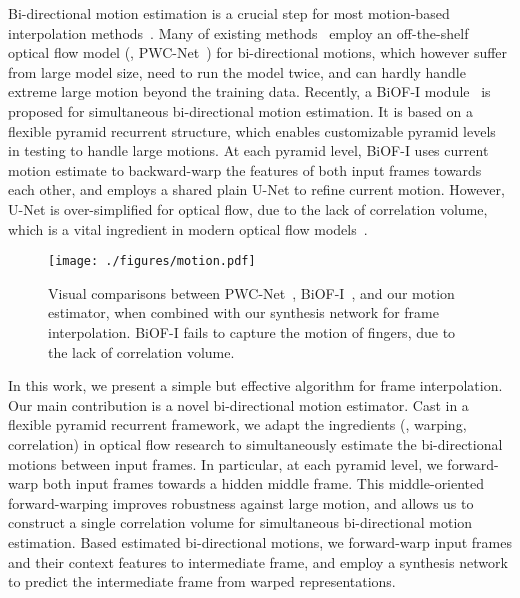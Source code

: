 \documentclass[10pt,twocolumn,letterpaper]{article}
\begin{document}
Bi-directional motion estimation is a crucial step for most motion-based
interpolation
methods~\cite{niklaus2018context,niklaus2020softmax,jiang2018super,bao2019depth,sim2021xvfi}.
Many of existing
methods~\cite{niklaus2018context,bao2019depth,niklaus2020softmax} employ an
off-the-shelf optical flow model (\eg, PWC-Net~\cite{sun2018pwc}) for
bi-directional motions, which however suffer from large model size, need to run
the model twice, and can hardly handle extreme large motion beyond the training
data. Recently, a BiOF-I module~\cite{sim2021xvfi} is proposed for simultaneous
bi-directional motion estimation. It is based on a flexible pyramid recurrent
structure, which enables customizable pyramid levels in testing to handle large
motions.  At each pyramid level, BiOF-I uses current motion estimate to
backward-warp the features of both input frames towards each other, and employs
a shared plain U-Net to refine current motion.  However, U-Net is
over-simplified for optical flow, due to the lack of correlation volume, which
is a vital ingredient in modern optical flow
models~\cite{sun2018pwc,teed2020raft}.





\begin{figure}[tb]
\centering
\texttt{[image: ./figures/motion.pdf]}
\caption{Visual comparisons between PWC-Net~\cite{sun2018pwc},
BiOF-I~\cite{sim2021xvfi}, and our motion estimator, when combined with our
synthesis network for frame interpolation. BiOF-I fails to capture the motion of
fingers, due to the lack of correlation volume.}
\label{fig:motion-map}
\end{figure}







In this work, we present a simple but effective algorithm for frame
interpolation. Our main contribution is a novel bi-directional motion estimator.
Cast in a flexible pyramid recurrent framework, we adapt the ingredients (\eg,
warping, correlation) in optical flow research to simultaneously estimate the
bi-directional motions between input frames. In particular, at each pyramid
level, we forward-warp both input frames towards a hidden middle frame. This
middle-oriented forward-warping improves robustness against large motion, and
allows us to construct a single correlation volume for simultaneous
bi-directional motion estimation.  Based estimated bi-directional motions, we
forward-warp input frames and their context features to intermediate frame, and
employ a synthesis network to predict the intermediate frame from warped
representations.
\end{document}
